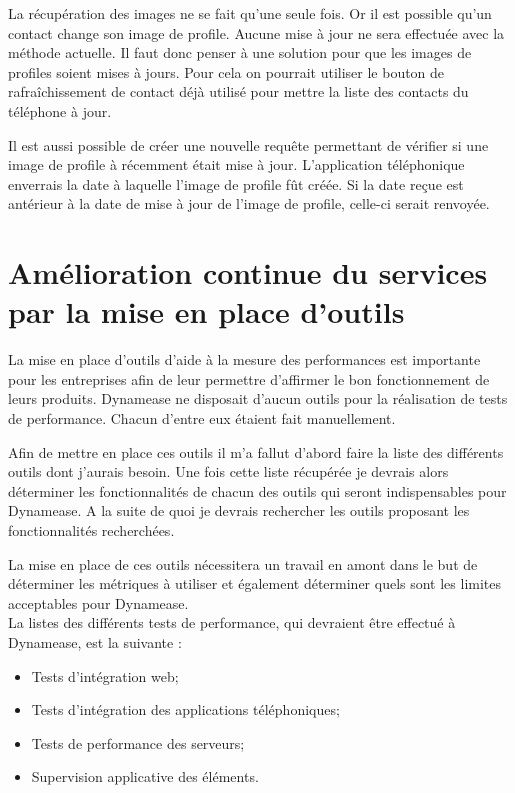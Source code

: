 La récupération des images ne se fait qu'une seule fois. Or il est possible qu'un contact change son image de profile. Aucune mise à jour ne sera effectuée avec la méthode actuelle. Il faut donc penser à une solution pour que les images de profiles soient mises à jours. Pour cela on pourrait utiliser le bouton de rafraîchissement de contact déjà utilisé pour mettre la liste des contacts du téléphone à jour.

Il est aussi possible de créer une nouvelle requête permettant de vérifier si une image de profile à récemment était mise à jour. L'application téléphonique enverrais la date à laquelle l'image de profile fût créée. Si la date reçue est antérieur à la date de mise à jour de l'image de profile, celle-ci serait renvoyée. 


\section{Amélioration continue du services par la mise en place d'outils}

La mise en place d'outils d'aide à la mesure des performances est importante pour les entreprises afin de leur permettre d'affirmer le bon fonctionnement de leurs produits. Dynamease ne disposait d'aucun outils pour la réalisation de tests de performance. Chacun d'entre eux étaient fait manuellement.

Afin de mettre en place ces outils il m'a fallut d'abord faire la liste des différents outils dont j'aurais besoin. Une fois cette liste récupérée je devrais alors déterminer les fonctionnalités de chacun des outils qui seront indispensables pour Dynamease. A la suite de quoi je devrais rechercher les outils proposant les fonctionnalités recherchées.

La mise en place de ces outils nécessitera un travail en amont dans le but de déterminer les métriques à utiliser et également déterminer quels sont les limites acceptables pour Dynamease.\\

La listes des différents tests de performance, qui devraient être effectué à Dynamease, est la suivante :

\begin{itemize}
	\item Tests d'intégration web;
	\item Tests d'intégration des applications téléphoniques;
	\item Tests de performance des serveurs;
	\item Supervision applicative des éléments.
\end{itemize}

